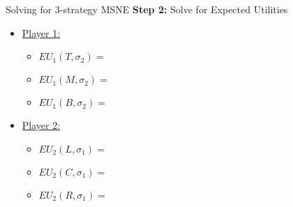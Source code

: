 \begin{frame}{Solving for 3-strategy MSNE}
  \textbf{Step 2:} Solve for Expected Utilities

  \begin{multicols}{2}
  \begin{minipage}{.5\textwidth}
  \begin{itemize}
    
    \item \underline{Player 1:}
    \begin{itemize}

      \item $EU_1(T, \sigma_2) = $
      \vspace{8mm}

      \item $EU_1(M, \sigma_2) = $
      \vspace{8mm}

     \item $EU_1(B, \sigma_2) = $
      \vspace{8mm}
      
    \end{itemize}
  \end{itemize}
  \end{minipage}

  \begin{minipage}{.5\textwidth}
  \begin{itemize}
    
    \item \underline{Player 2:}
    \begin{itemize}

      \item $EU_2(L, \sigma_1) = $
      \vspace{8mm}
      \item $EU_2(C, \sigma_1) = $
      \vspace{8mm}
      \item $EU_2(R, \sigma_1) = $
      \vspace{8mm}
      
    \end{itemize}
  \end{itemize}
  \end{minipage}
  \end{multicols}

\end{frame}


